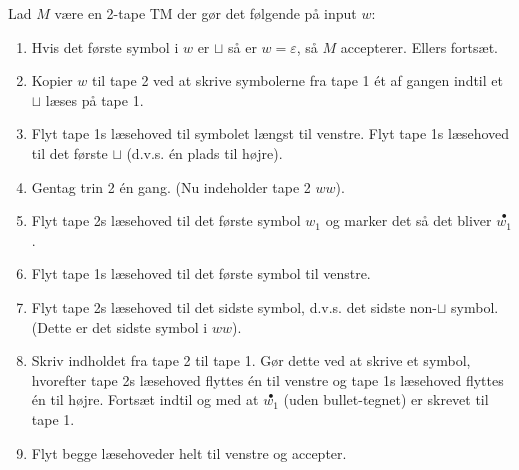 Lad $M$ være en 2-tape TM der gør det følgende på input $w$: 
\begin{enumerate}
	\item Hvis det første symbol i $w$ er $\sqcup$ så er $w=\varepsilon$, så $M$ accepterer. Ellers fortsæt. 
	\item Kopier $w$ til tape 2 ved at skrive symbolerne fra tape 1 ét af gangen indtil et $\sqcup$ læses på tape 1. 
	\item Flyt tape 1s læsehoved til symbolet længst til venstre. Flyt tape 1s læsehoved til det første $\sqcup$ (d.v.s. én plads til højre).
	\item Gentag trin 2 én gang. (Nu indeholder tape 2 $ww$).
	\item Flyt tape 2s læsehoved til det første symbol $w_1$ og marker det så det bliver $\stackrel{\bullet}{w_1}$. 
	\item Flyt tape 1s læsehoved til det første symbol til venstre. 
	\item Flyt tape 2s læsehoved til det sidste symbol, d.v.s. det sidste non-$\sqcup$ symbol. (Dette er det sidste symbol i $ww$).
	\item Skriv indholdet fra tape 2 til tape 1. Gør dette ved at skrive et symbol, hvorefter tape 2s læsehoved flyttes én til venstre og tape 1s læsehoved flyttes én til højre. Fortsæt indtil og med at $\stackrel{\bullet}{w_1}$ (uden bullet-tegnet) er skrevet til tape 1.
	\item Flyt begge læsehoveder helt til venstre og accepter. 
\end{enumerate}




